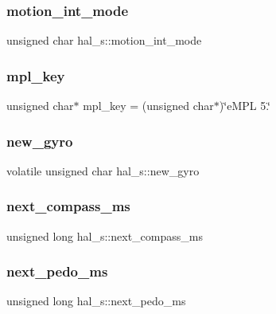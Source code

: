 \mbox{\label{group__e_m_p_l_ga1cbe790c552b9d5b2097c122ef91362e}} 
\subsubsection{motion\+\_\+int\+\_\+mode}
{\footnotesize\ttfamily unsigned char hal\+\_\+s\+::motion\+\_\+int\+\_\+mode}

\mbox{\label{group__e_m_p_l_ga56d9a02ae0e768d49fd95fd014c47b07}} 
\subsubsection{mpl\+\_\+key}
{\footnotesize\ttfamily unsigned char$\ast$ mpl\+\_\+key = (unsigned char$\ast$)\char`\"{}e\+M\+PL 5.\char`\"{}}

\mbox{\label{group__e_m_p_l_gad26aab5f2b7bb0c9d115e8cb6c7f91ba}} 
\subsubsection{new\+\_\+gyro}
{\footnotesize\ttfamily volatile unsigned char hal\+\_\+s\+::new\+\_\+gyro}

\mbox{\label{group__e_m_p_l_ga1453f27f878d6f8c675ea57b56143af9}} 
\subsubsection{next\+\_\+compass\+\_\+ms}
{\footnotesize\ttfamily unsigned long hal\+\_\+s\+::next\+\_\+compass\+\_\+ms}

\mbox{\label{group__e_m_p_l_ga2c4d027b190f5f4cd1518c6331b88a86}} 
\subsubsection{next\+\_\+pedo\+\_\+ms}
{\footnotesize\ttfamily unsigned long hal\+\_\+s\+::next\+\_\+pedo\+\_\+ms}

